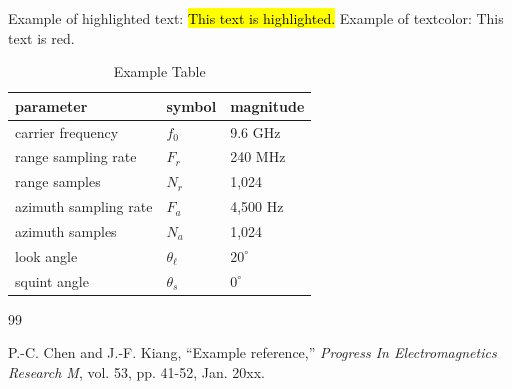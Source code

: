 \documentclass[journal,onecolumn]{IEEEtran}
\begin{document}
Example of highlighted text: \hl{This text is highlighted.}
Example of textcolor: {\color{red} This text is red.}

\begin{table}[h]
\centering
\caption{Example Table} \label{tab:title} 
\begin{tabular}{|p{100pt}|p{45pt}|p{65pt}|} 
\hline
parameter                 & symbol                      & magnitude           \\ \hline
carrier frequency         & $f_0$                       & 9.6 GHz             \\ \hline
range sampling rate       & $F_r$                       & 240 MHz              \\ \hline
range samples             & $N_r$                       & 1,024                 \\ \hline
azimuth sampling rate     & $F_a$                       & 4,500 Hz              \\ \hline
azimuth samples           & $N_a$                       & 1,024                 \\ \hline
look angle                & $\theta_\ell $              & $20^\circ$          \\ \hline
squint angle              & $\theta_s$                  & $0^\circ$           \\ \hline
\end{tabular}
\label{ex_table}
\end{table}


\begin{thebibliography}{99}

P.-C. Chen and J.-F. Kiang,
``Example reference,''
{\em Progress In Electromagnetics Research M}, vol. 53, pp. 41-52, Jan. 20xx.

\end{thebibliography}

\end{document}
